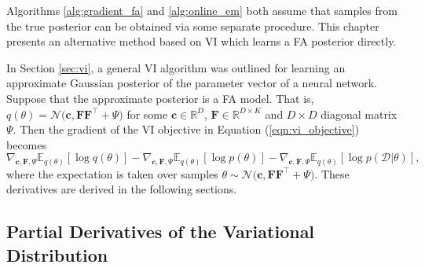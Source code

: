\documentclass[msc,deptreport.inf]{infthesis} %
\newcommand{\matr}[1]{\mathbf{#1}}
\newcommand{\R}{\mathbb R}
\newcommand{\E}{\mathbb E}
\begin{document}
Algorithms \ref{alg:gradient_fa} and \ref{alg:online_em} both assume that samples from the true posterior can be obtained via some separate procedure. This chapter presents an alternative method based on VI which learns a FA posterior directly.  

In Section \ref{sec:vi}, a general VI algorithm was outlined for learning an approximate Gaussian posterior of the parameter vector of a neural network. Suppose that the approximate posterior is a FA model. That is, $q(\theta) = \mathcal{N}\big(\matr{c}, \matr{FF}^{\intercal} + \Psi\big)$ for some $\matr{c} \in \R^D$, $\matr{F} \in \R^{D \times K}$ and $D \times D$ diagonal matrix $\Psi$. Then the gradient of the VI objective in Equation (\ref{eqn:vi_objective}) becomes 
\begin{equation}\label{eqn:vi_fa_derivatives}
	\nabla_{\matr{c}, \matr{F}, \Psi} \E_{q(\theta)} [\log q(\theta)]
	- \nabla_{\matr{c}, \matr{F}, \Psi} \E_{q(\theta)} [\log p(\theta)]
	-  \nabla_{\matr{c}, \matr{F}, \Psi} \E_{q(\theta)} [\log p(\mathcal{D} | \theta)],
\end{equation}
where the expectation is taken over samples $\theta \sim \mathcal{N}\big(\matr{c}, \matr{FF}^{\intercal} + \Psi\big)$. These derivatives are derived in the following sections. 


\subsection{Partial Derivatives of the Variational Distribution}
\end{document}
